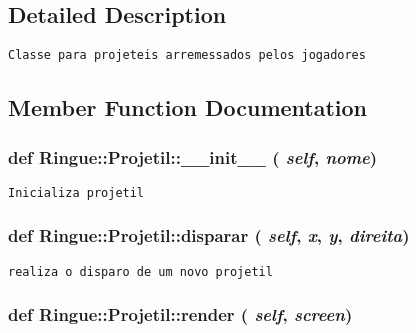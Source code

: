 \subsection{Detailed Description}


\begin{footnotesize}\begin{verbatim}Classe para projeteis arremessados pelos jogadores \end{verbatim}
\end{footnotesize}
 

\subsection{Member Function Documentation}
\hypertarget{class_ringue_1_1_projetil_6034b46e61e22a362ba5ad0003ab1ef7}{
\subsubsection[{\_\-\_\-init\_\-\_\-}]{\setlength{\rightskip}{0pt plus 5cm}def Ringue::Projetil::\_\-\_\-init\_\-\_\- ( {\em self}, \/   {\em nome})}}
\label{class_ringue_1_1_projetil_6034b46e61e22a362ba5ad0003ab1ef7}




\begin{footnotesize}\begin{verbatim}Inicializa projetil \end{verbatim}
\end{footnotesize}
 \hypertarget{class_ringue_1_1_projetil_7b77cc2e74d9332d4d48e2fad93bdeb5}{
\subsubsection[{disparar}]{\setlength{\rightskip}{0pt plus 5cm}def Ringue::Projetil::disparar ( {\em self}, \/   {\em x}, \/   {\em y}, \/   {\em direita})}}
\label{class_ringue_1_1_projetil_7b77cc2e74d9332d4d48e2fad93bdeb5}




\begin{footnotesize}\begin{verbatim}realiza o disparo de um novo projetil \end{verbatim}
\end{footnotesize}
 \hypertarget{class_ringue_1_1_projetil_8dc4d0480366c09189d0aa90ea131032}{
\subsubsection[{render}]{\setlength{\rightskip}{0pt plus 5cm}def Ringue::Projetil::render ( {\em self}, \/   {\em screen})}}
\label{class_ringue_1_1_projetil_8dc4d0480366c09189d0aa90ea131032}





